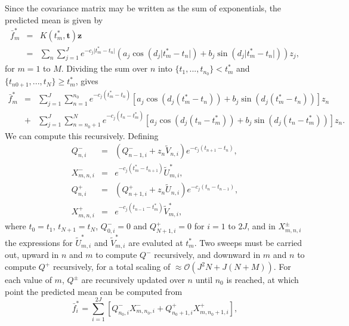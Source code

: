 \documentclass[manuscript, letterpaper]{aastex6}
\newcommand{\bvec}[1]{{\ensuremath{\boldsymbol{#1}}}}
\begin{document}
Since the covariance matrix may be written as the sum of exponentials, the predicted mean is given by
\begin{eqnarray}
\bar f^*_m &=& K(t^*_m,\bvec{t}) \bvec{z} \\
&=& \sum_n \sum_{j=1}^J e^{-c_j \vert t^*_m-t_n\vert}\left(a_j \cos{(d_j \vert t^*_m-t_n\vert)} +b_j \sin{(d_j \vert t^*_m-t_n\vert)}\right) z_j,
\end{eqnarray}
for $m =1$ to $M$.
Dividing the sum over $n$ into $\{t_1,...,t_{n_0}\} < t^*_m$ and
$\{t_{n0+1},...,t_N\} \ge t^*_m$, gives
\begin{eqnarray}
\bar f^*_m &=& \sum_{j=1}^J\sum_{n=1}^{n_0} e^{-c_j(t^*_m-t_n)} \left[a_j \cos{(d_j(t^*_m-t_n))}+b_j\sin{(d_j(t^*_m-t_n))}\right] z_n \\
&+& \sum_{j=1}^J\sum_{n=n_0+1}^N  e^{-c_j(t_n-t^*_m)} \left[a_j \cos{(d_j(t_n-t^*_m))}+b_j\sin{(d_j(t_n-t^*_m))}\right] z_n.
\end{eqnarray}
We can compute this recursively.  Defining
\begin{eqnarray}
Q^-_{n,i} &=& \left(Q^-_{n-1,i}+z_n\tilde V_{n,i}\right)e^{-c_j(t_{n+1}-t_{n})},\\
X^-_{m,n,i} &=& e^{-c_j(t_m^*-t_{n+1})}\tilde U_{m,i}^*,\\
Q^+_{n,i} &=& \left(Q^+_{n+1,i}+z_n\tilde U_{n,i}\right)e^{-c_j(t_{n}-t_{n-1})},\\
X^+_{m,n,i} &=& e^{-c_j(t_{n-1}-t_m^*)} \tilde V_{m,i}^*,
\end{eqnarray}
where $t_0=t_1$, $t_{N+1}=t_N$, $Q^-_{0,i} = 0$ and $Q^+_{N+1,i}=0$ for $i=1$ to $2J$, and in $X^\pm_{m,n,i}$ the expressions
for $\tilde U_{m,i}^*$ and $\tilde V_{m,i}^*$ are evaluted at $t_m^*$.
Two sweeps must be carried out, upward in $n$ and $m$ to compute $Q^-$ recursively, and downward in
$m$ and $n$ to compute $Q^+$ recursively, for a total scaling of $\approx \mathcal{O}(J^2N+J(N+M))$.
For each value of $m$, $Q^\pm$ are recursively updated over $n$ until $n_0$ is reached, at which
point the predicted mean can be computed from
\begin{equation}
\bar f^*_i = \sum_{i=1}^{2J} \left[Q^-_{n_0,i}X^-_{m,n_0,i}+Q^+_{n_0+1,i}X^+_{m,n_0+1,i}\right],
\end{equation}
\end{document}

